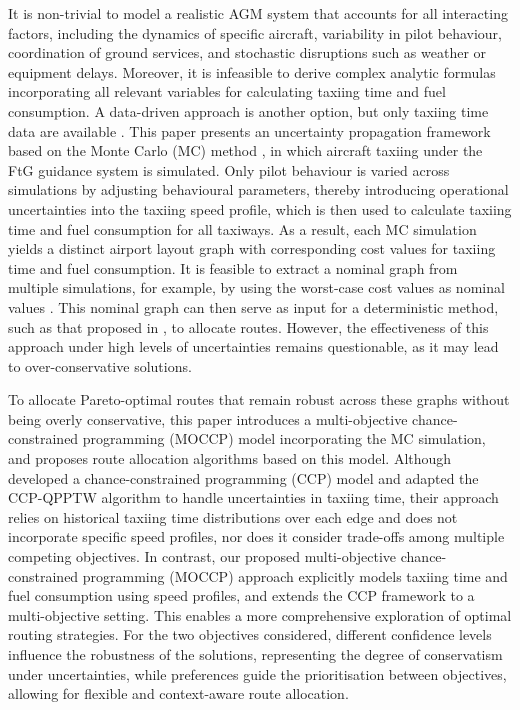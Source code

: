 \documentclass{article}
\begin{document}
It is non-trivial to model a realistic AGM system that accounts for all interacting factors, including the dynamics of specific aircraft, variability in pilot behaviour, coordination of ground services, and stochastic disruptions such as weather or equipment delays. Moreover, it is infeasible to derive complex analytic formulas incorporating all relevant variables for calculating taxiing time and fuel consumption. A data-driven approach is another option, but only taxiing time data are available \cite{brownlee2018fuzzy, wang2021chance}. This paper presents an uncertainty propagation framework based on the Monte Carlo (MC) method \cite{kalos2009monte}, in which aircraft taxiing under the FtG guidance system \cite{zhang2020feasibility} is simulated. Only pilot behaviour is varied across simulations by adjusting behavioural parameters, thereby introducing operational uncertainties into the taxiing speed profile, which is then used to calculate taxiing time and fuel consumption for all taxiways. As a result, each MC simulation yields a distinct airport layout graph with corresponding cost values for taxiing time and fuel consumption. It is feasible to extract a nominal graph from multiple simulations, for example, by using the worst-case cost values as nominal values \cite{brownlee2018fuzzy}. This nominal graph can then serve as input for a deterministic method, such as that proposed in \cite{weiszer2020multi}, to allocate routes. However, the effectiveness of this approach under high levels of uncertainties remains questionable, as it may lead to over-conservative solutions. 

To allocate Pareto-optimal routes that remain robust across these graphs without being overly conservative, this paper introduces a multi-objective chance-constrained programming (MOCCP) model incorporating the MC simulation, and proposes route allocation algorithms based on this model. Although \cite{wang2021chance} developed a chance-constrained programming (CCP) model and adapted the CCP-QPPTW algorithm to handle uncertainties in taxiing time, their approach relies on historical taxiing time distributions over each edge and does not incorporate specific speed profiles, nor does it consider trade-offs among multiple competing objectives. In contrast, our proposed multi-objective chance-constrained programming (MOCCP) approach explicitly models taxiing time and fuel consumption using speed profiles, and extends the CCP framework to a multi-objective setting. This enables a more comprehensive exploration of optimal routing strategies. For the two objectives considered, different confidence levels influence the robustness of the solutions, representing the degree of conservatism under uncertainties, while preferences guide the prioritisation between objectives, allowing for flexible and context-aware route allocation. 
\end{document}
